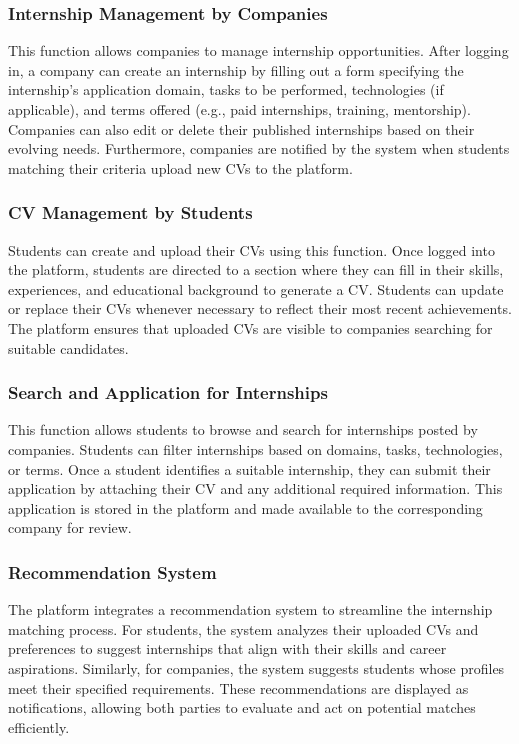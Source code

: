 \documentclass[12pt]{article}
\begin{document}
\subsubsection{Internship Management by Companies}
This function allows companies to manage internship opportunities. After logging in, a company can create an internship by filling out a form specifying the internship’s application domain, tasks to be performed, technologies (if applicable), and terms offered (e.g., paid internships, training, mentorship). Companies can also edit or delete their published internships based on their evolving needs. Furthermore, companies are notified by the system when students matching their criteria upload new CVs to the platform.

\subsubsection{CV Management by Students}
Students can create and upload their CVs using this function. Once logged into the platform, students are directed to a section where they can fill in their skills, experiences, and educational background to generate a CV. Students can update or replace their CVs whenever necessary to reflect their most recent achievements. The platform ensures that uploaded CVs are visible to companies searching for suitable candidates. %

\subsubsection{Search and Application for Internships}
This function allows students to browse and search for internships posted by companies. Students can filter internships based on domains, tasks, technologies, or terms. Once a student identifies a suitable internship, they can submit their application by attaching their CV and any additional required information. This application is stored in the platform and made available to the corresponding company for review.

\subsubsection{Recommendation System}
The platform integrates a recommendation system to streamline the internship matching process. For students, the system analyzes their uploaded CVs and preferences to suggest internships that align with their skills and career aspirations. Similarly, for companies, the system suggests students whose profiles meet their specified requirements. These recommendations are displayed as notifications, allowing both parties to evaluate and act on potential matches efficiently.
\end{document}
